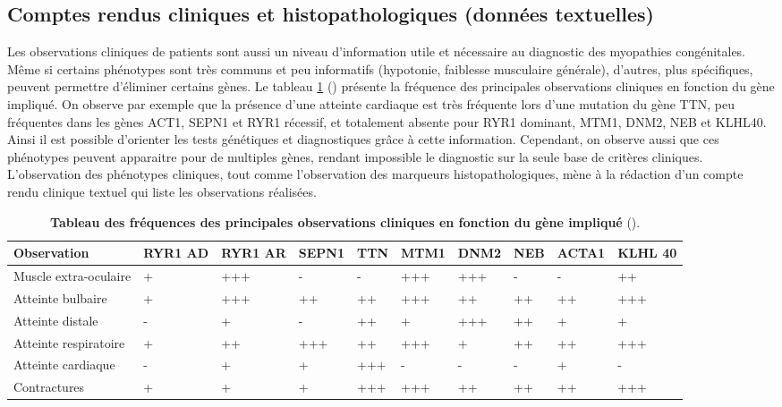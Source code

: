 \subsection{Comptes rendus cliniques et histopathologiques (données textuelles) }
Les observations cliniques de patients sont aussi un niveau d'information utile et nécessaire au diagnostic des myopathies congénitales. Même si certains phénotypes sont très communs et peu informatifs (hypotonie, faiblesse musculaire générale), d'autres, plus spécifiques, peuvent permettre d'éliminer certains gènes. Le tableau \ref{tab:clinic} (\cite{jungbluth_congenital_2018}) présente la fréquence des principales observations cliniques en fonction du gène impliqué. On observe par exemple que la présence d'une atteinte cardiaque est très fréquente lors d'une mutation du gène TTN, peu fréquentes dans les  gènes ACT1, SEPN1 et RYR1 récessif, et totalement absente pour RYR1 dominant, MTM1, DNM2, NEB et KLHL40. Ainsi il est possible d'orienter les tests génétiques et diagnostiques grâce à cette information. Cependant, on observe aussi que ces phénotypes peuvent apparaitre pour de multiples gènes, rendant impossible le diagnostic sur la seule base de critères cliniques. L'observation des phénotypes cliniques, tout comme l'observation des marqueurs histopathologiques, mène à la rédaction d'un compte rendu clinique textuel qui liste les observations réalisées.

\begin{table}[!ht]
\begin{tabularx}{\textwidth}{|p{1.8cm}|X|X|X|X|X|X|X|X|X|}
 \hline
\textbf{Observation} & \textbf{RYR1 AD} & \textbf{RYR1 AR} & \textbf{SEPN1} & \textbf{TTN} & \textbf{MTM1} & \textbf{DNM2} & \textbf{NEB} & \textbf{ACTA1} & \textbf{KLHL 40} \\
\hline
Muscle extra-oculaire & + & +++ & - & - & +++ & +++ & - & - & ++ \\
\hline
Atteinte bulbaire & + & +++ & ++ & ++ & +++ & ++ & ++ & ++ & +++ \\
\hline
Atteinte distale  & - & + & - & ++ & + & +++ & ++ & + & + \\
\hline
Atteinte respiratoire & + & ++ & +++ & ++ & +++ & + & ++ & ++ & +++ \\
\hline
Atteinte cardiaque & - & + & + & +++ & - & - & - & + & - \\
\hline
Contractures & + & + & + & +++ & +++ & ++ & ++ & ++ & +++ \\
\hline
\end{tabularx}
\caption[Tableau des fréquences des principales observations cliniques en fonction du gène impliqué]{\textbf{Tableau des fréquences des principales observations cliniques en fonction du gène impliqué} (\cite{jungbluth_congenital_2018}). }
\label{tab:clinic}
\end{table}

